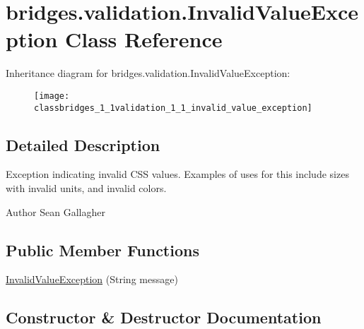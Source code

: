 \hypertarget{classbridges_1_1validation_1_1_invalid_value_exception}{}\section{bridges.\+validation.\+Invalid\+Value\+Exception Class Reference}
\label{classbridges_1_1validation_1_1_invalid_value_exception}
Inheritance diagram for bridges.\+validation.\+Invalid\+Value\+Exception\+:\begin{figure}[H]
\begin{center}
\leavevmode
\texttt{[image: classbridges\_1\_1validation\_1\_1\_invalid\_value\_exception]}
\end{center}
\end{figure}


\subsection{Detailed Description}
Exception indicating invalid C\+SS values. Examples of uses for this include sizes with invalid units, and invalid colors. \begin{DoxyAuthor}{Author}
Sean Gallagher 
\end{DoxyAuthor}
\subsection*{Public Member Functions}
\begin{DoxyCompactItemize}
\item 
\mbox{\hyperlink{classbridges_1_1validation_1_1_invalid_value_exception_adf4c16bcef674454b87d8cc035efc75d}{Invalid\+Value\+Exception}} (String message)
\end{DoxyCompactItemize}


\subsection{Constructor \& Destructor Documentation}
\mbox{\label{classbridges_1_1validation_1_1_invalid_value_exception_adf4c16bcef674454b87d8cc035efc75d}} 
